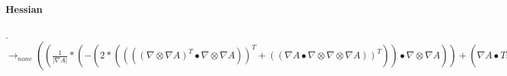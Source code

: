 \documentclass{article}
\begin{document}
 \paragraph{Hessian}
 .
 \\ \newline $\rightarrow_{none}
 (( \frac{1}{| \nabla A|}*(-{(2*(((( \nabla  \otimes  \nabla A)^T \bullet  \nabla  \otimes  \nabla A))^T+(( \nabla A \bullet  \nabla  \otimes  \nabla  \otimes  \nabla A))^T))} \bullet  \nabla  \otimes  \nabla A))+( \nabla A \bullet Trav((Trav(((-{(2*(((( \nabla  \otimes  \nabla A)^T \bullet  \nabla  \otimes  \nabla A))^T+(( \nabla A \bullet  \nabla  \otimes  \nabla  \otimes  \nabla A))^T))}* \frac{(-1*( \nabla A \bullet  \nabla  \otimes  \nabla A))}{(( \nabla A \bullet  \nabla A)*| \nabla A|)})))<:,2,1>+( \frac{1}{| \nabla A|}*-{(2*(Trav((( \nabla  \otimes  \nabla A)^T \bullet  \nabla  \otimes  \nabla  \otimes  \nabla A))<:,2,1>+Trav((( \nabla  \otimes  \nabla A)^T \bullet  \nabla  \otimes  \nabla  \otimes  \nabla A))<1,2,0>+Trav((Trav( \nabla  \otimes  \nabla  \otimes  \nabla A)<2,1,0> \bullet  \nabla  \otimes  \nabla A))<1,2,0>+Trav(( \nabla A \bullet  \nabla  \otimes  \nabla  \otimes  \nabla  \otimes  \nabla A))<1,2,0>))})))<1,2,0>)+(((( \frac{1}{| \nabla A|}* \nabla  \otimes  \nabla A))^T+((( \nabla A* \frac{(-1*( \nabla A \bullet  \nabla  \otimes  \nabla A))}{(( \nabla A \bullet  \nabla A)*| \nabla A|)})))^T) \bullet (-{(2*(((( \nabla  \otimes  \nabla A)^T \bullet  \nabla  \otimes  \nabla A))^T+(( \nabla A \bullet  \nabla  \otimes  \nabla  \otimes  \nabla A))^T))})^T)+(-{(2*( \nabla A \bullet  \nabla  \otimes  \nabla A))} \bullet Trav((Trav((( \nabla  \otimes  \nabla A* \frac{(-1*( \nabla A \bullet  \nabla  \otimes  \nabla A))}{(( \nabla A \bullet  \nabla A)*| \nabla A|)})))<1,2,0>+Trav(( \frac{1}{| \nabla A|}* \nabla  \otimes  \nabla  \otimes  \nabla A))<1,2,0>+Trav((( \frac{(-1*( \nabla A \bullet  \nabla  \otimes  \nabla A))}{(( \nabla A \bullet  \nabla A)*| \nabla A|)}* \nabla  \otimes  \nabla A)))<:,2,1>+Trav((( \nabla A* \frac{((-1*( \nabla A \bullet  \nabla A)*| \nabla A|*((( \nabla  \otimes  \nabla A)^T \bullet  \nabla  \otimes  \nabla A)+( \nabla A \bullet  \nabla  \otimes  \nabla  \otimes  \nabla A)))-(-1*(( \nabla A \bullet  \nabla  \otimes  \nabla A) \otimes ((( \nabla A \bullet  \nabla A)* \frac{( \nabla A \bullet  \nabla  \otimes  \nabla A)}{| \nabla A|})+(| \nabla A|*2*( \nabla A \bullet  \nabla  \otimes  \nabla A))))))}{(( \nabla A \bullet  \nabla A)*| \nabla A|*( \nabla A \bullet  \nabla A)*| \nabla A|)})))<1,2,0>))<1,2,0>))$
\end{document}
